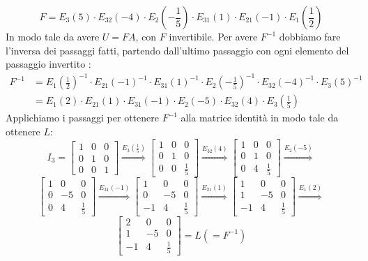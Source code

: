 \documentclass[a4paper, 10pt]{article}
\begin{document}
	\[ F = E_{3}(5) \cdot E_{32}(-4) \cdot E_{2}(-\frac{1}{5}) \cdot E_{31}(1) \cdot 
	E_{21}(-1) \cdot E_{1}(\frac{1}{2}) \]
	In modo tale da avere $U = FA$, con $F$ invertibile. 
	Per avere $F^{-1}$ dobbiamo fare l'inversa dei passaggi fatti, partendo dall'ultimo passaggio con 
	ogni elemento del passaggio invertito :
	\begin{equation*}
		\begin{split}
		F^{-1} &= E_{1}(\frac{1}{2})^{-1} \cdot E_{21}(-1)^{-1} \cdot E_{31}(1)^{-1} \cdot E_{2}(-\frac{1}{5})^{-1} 
		\cdot E_{32}(-4)^{-1} \cdot E_{3}(5)^{-1} \\
		&= E_{1}(2) \cdot E_{21}(1) \cdot E_{31}(-1) \cdot E_{2}(-5) \cdot E_{32}(4) \cdot E_{3}(\frac{1}{5})
		\end{split}
	\end{equation*}
	Applichiamo i passaggi per ottenere $F^{-1}$ alla matrice identità in modo tale da ottenere $L$:
	\[
		I_3 =
		\begin{bmatrix}
			1 & 0 & 0 \\
			0 & 1 & 0 \\
			0 & 0 & 1
		\end{bmatrix}
		\stackrel{E_{3}(\frac{1}{5})}\Longrightarrow
		\begin{bmatrix}
			1 & 0 & 0 \\
			0 & 1 & 0 \\
			0 & 0 & \frac{1}{5}
		\end{bmatrix}
		\stackrel{E_{32}(4)}\Longrightarrow
		\begin{bmatrix}
			1 & 0 & 0 \\
			0 & 1 & 0 \\
			0 & 4 & \frac{1}{5}
		\end{bmatrix}
		\stackrel{E_{2}(-5)}\Longrightarrow
	\]
	\[
		\begin{bmatrix}
			1 & 0 & 0 \\
			0 & -5 & 0 \\
			0 & 4 & \frac{1}{5}
		\end{bmatrix}
		\stackrel{E_{31}(-1)}\Longrightarrow
		\begin{bmatrix}
			1 & 0 & 0 \\
			0 & -5 & 0 \\
			-1 & 4 & \frac{1}{5}
		\end{bmatrix}
		\stackrel{E_{21}(1)}\Longrightarrow
		\begin{bmatrix}
			1 & 0 & 0 \\
			1 & -5 & 0 \\
			-1 & 4 & \frac{1}{5}
		\end{bmatrix}
		\stackrel{E_{1}(2)}\Longrightarrow
	\]
	\[
		\begin{bmatrix}
			2 & 0 & 0 \\
			1 & -5 & 0 \\
			-1 & 4 & \frac{1}{5}
		\end{bmatrix}
		= L (=F^{-1})
	\]
	
\end{document}
